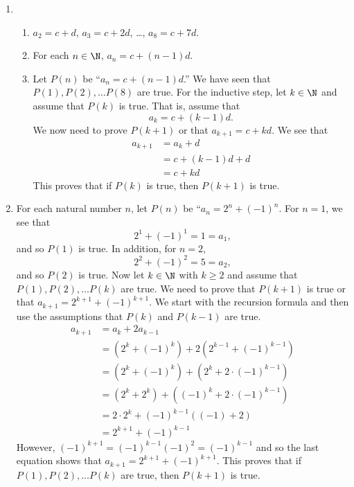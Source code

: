 \begin{enumerate}
\item \begin{enumerate}
\item $a_2 = c + d$, $a_3 = c + 2d$, \ldots, $a_8 = c + 7d$.
\item For each $n \in \N$, $a_n = c + (n - 1)d$.
\item Let $P(n)$ be ``$a_n = c + (n - 1)d$.''  We have seen that $P(1), P(2), \ldots P(8)$ are true.  For the inductive step, let $k \in \N$ and assume that $P(k)$ is true.  That is, assume that
\[
a_k = c + (k - 1)d.
\]
We now need to prove $P(k+1)$ or that $a_{k+1} = c + k d$.  We see that
\begin{align*}
a_{k+1} &= a_k + d \\
        &= c + (k - 1)d + d \\
        &= c + k d
\end{align*}
This proves that if $P(k)$ is true, then $P(k + 1)$ is true.
\end{enumerate}



\item For each natural number $n$, let $P(n)$ be ``$a_n = 2^n + (-1)^n$. For $n = 1$, we see that
\[
2^1 + (-1)^1 = 1 = a_1,
\]
and so $P(1)$ is true.  In addition, for $n = 2$,
\[
2^2 + (-1)^2 = 5 = a_2,
\]
and so $P(2)$ is true. Now let $k \in \N$ with $k \geq 2$ and assume that \\$P(1), P(2), \ldots P(k)$ are true.  We need to prove that $P(k + 1)$ is true or that $a_{k+1} = 2^{k+1} + (-1)^{k+1}$.  We start with the recursion formula and then use the assumptions that $P(k)$ and $P(k-1)$ are true.
\begin{align*}
a_{k+1} &= a_k + 2a_{k-1} \\
        &= \left( 2^k + (-1)^k \right) + 2\left( 2^{k-1} + (-1)^{k-1} \right) \\
        &= \left( 2^k + (-1)^k \right) + \left( 2^k + 2 \cdot (-1)^{k-1} \right) \\
        &= \left( 2^k + 2^k \right) + \left( (-1)^k + 2 \cdot (-1)^{k-1} \right) \\
        &= 2 \cdot 2^k + (-1)^{k-1} \left( (-1) + 2 \right) \\
        &= 2^{k+1} + (-1)^{k-1}
\end{align*}
However, $(-1)^{k+1} = (-1)^{k-1}(-1)^2 = (-1)^{k-1}$ and so the last equation shows that 
$a_{k+1} = 2^{k+1} + (-1)^{k+1}$.  This proves that if $P(1), P(2), \ldots P(k)$ are true, then $P(k+1)$ is true.






\end{enumerate}
